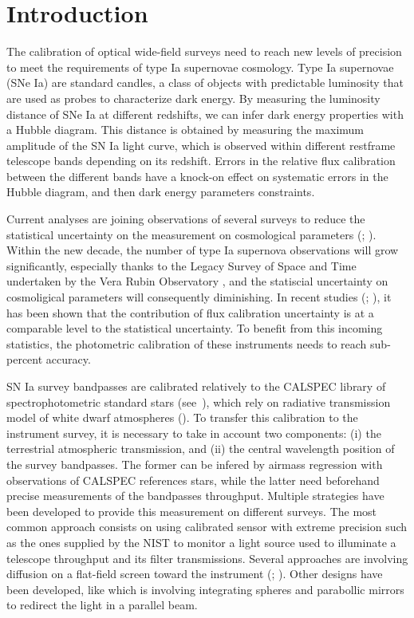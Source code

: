 \section{Introduction}

The calibration of optical wide-field surveys need to reach new levels of precision to meet the requirements of type Ia supernovae cosmology. Type Ia supernovae (SNe Ia) are standard candles, a class of objects with predictable luminosity that are used as probes to characterize dark energy. By measuring the luminosity distance of SNe Ia at different redshifts, we can infer dark energy properties with a Hubble diagram. This distance is obtained by measuring the maximum amplitude of the SN Ia light curve, which is observed within different restframe telescope bands depending on its redshift. Errors in the relative flux calibration between the different bands have a knock-on effect on systematic errors in the Hubble diagram, and then dark energy parameters constraints.

Current analyses are joining observations of several surveys to reduce the statistical uncertainty on the measurement on cosmological parameters (\cite{Brout_2022}; \cite{rubin2023union}). Within the new decade, the number of type Ia supernova observations will grow significantly, especially thanks to the Legacy Survey of Space and Time undertaken by the Vera Rubin Observatory  \citep{lsst}, and the statiscial uncertainty on cosmoligical parameters will consequently diminishing. In recent studies (\cite{Betoule_2014}; \cite{Scolnic_2018}), it has been shown that the contribution of flux calibration uncertainty is at a comparable level to the statistical uncertainty.  To benefit from this incoming statistics, the photometric calibration of these instruments needs to reach sub-percent accuracy.

SN Ia survey bandpasses are calibrated relatively to the CALSPEC library of spectrophotometric standard stars (see~\cite{Bohlin_2020}), which rely on radiative transmission model of white dwarf atmospheres (\cite{Narayan_2019}). To transfer this calibration to the instrument survey, it is necessary to take in account two components: (i) the terrestrial atmospheric transmission, and (ii) the central wavelength position of the survey bandpasses. The former can be infered by airmass regression with observations of CALSPEC references stars, while the latter need beforehand precise measurements of the bandpasses throughput. Multiple strategies have been developed to provide this measurement on different surveys. The most common approach consists on using calibrated sensor with extreme precision such as the ones supplied by the NIST \citep{houston2008detectors} to monitor a light source used to illuminate a telescope throughput and its filter transmissions. Several approaches are involving diffusion on a flat-field screen toward the instrument (\cite{stubbs2006}; \cite{marshall2013}). Other designs have been developed, like \cite{Lombardo_2017} which is involving integrating spheres and parabollic mirrors to redirect the light in a parallel beam.


